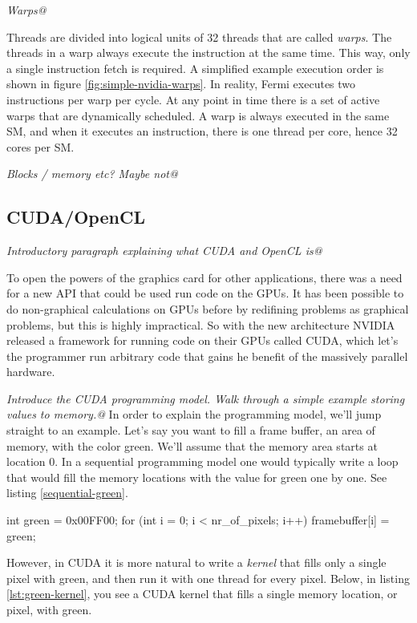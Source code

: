 \documentclass[../main/report.tex]{subfiles}
\begin{document}
\emph{Warps@}

Threads are divided into logical units of 32 threads that are called \emph{warps}. 
The threads in a warp always execute the instruction at the same time.
This way, only a single instruction fetch is required.
A simplified example execution order is shown in figure \ref{fig:simple-nvidia-warps}.
In reality, Fermi executes two instructions per warp per cycle. 
At any point in time there is a set of active warps that are dynamically scheduled. 
A warp is always executed in the same SM, and when it executes an instruction, there is one thread per core, hence 32 cores per SM.


\emph{Blocks / memory etc? Maybe not@}



\subsection{CUDA/OpenCL}
\emph{Introductory paragraph explaining what CUDA and OpenCL is@}

To open the powers of the graphics card for other applications, there was a need for a new API that could be
used run code on the GPUs. It has been possible to do non-graphical calculations on GPUs before by 
redifining problems as graphical problems, but this is highly impractical. 
So with the new architecture NVIDIA released a framework for running code on their GPUs called CUDA, 
which let's the programmer run arbitrary code that gains he benefit of the massively parallel hardware.

\emph{Introduce the CUDA programming model. Walk through a simple example storing values to memory.@}
In order to explain the programming model, we'll jump straight to an example.
Let's say you want to fill a frame buffer, an area of memory, with the color green.
We'll assume that the memory area starts at location 0.
In a sequential programming model one would typically write a loop that would fill
the memory locations with the value for green one by one. 
See listing \ref{sequential-green}.

\begin{c-code}[caption=A sequential program filling the screen with green, label=sequential-green]
int green = 0x00FF00;
for (int i = 0; i < nr_of_pixels; i++){
	framebuffer[i] = green;
}
\end{c-code}

However, in CUDA it is more natural to write a \emph{kernel} that fills only a single pixel with green, 
and then run it with one thread for every pixel.
Below, in listing \ref{lst:green-kernel}, 
you see a CUDA kernel that fills a single memory location, or pixel, with green. 
\end{document}
